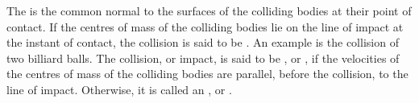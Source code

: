 The  is the common normal to the surfaces of the colliding bodies at their point of contact. If the centres of mass  of the colliding bodies lie on the line of impact at the instant of contact, the collision is said to be . An example is the collision of two billiard balls. The collision, or impact, is said to be , or , if the velocities of the centres of mass of the colliding bodies are parallel, before the collision, to the line of impact. Otherwise, it is called an , or .

